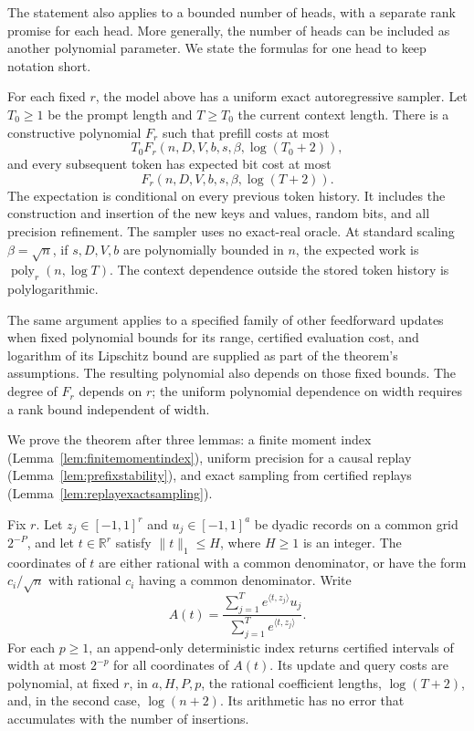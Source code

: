 The statement also applies to a bounded number of heads, with a
separate rank promise for each head.  More generally, the number of
heads can be included as another polynomial parameter.  We state
the formulas for one head to keep notation short.

\begin{theorem}
\label{thm:momentdecoder}
For each fixed $r$, the model above has a uniform exact autoregressive
sampler.  Let $T_0\ge1$ be the prompt length and $T\ge T_0$ the
current context length.  There is a constructive polynomial $F_r$
such that prefill costs at most
\[
 T_0 F_r(n,D,V,b,s,\beta,\log(T_0+2)),
\]
and every subsequent token has expected bit cost at most
\[
 F_r(n,D,V,b,s,\beta,\log(T+2)).
\]
The expectation is conditional on every previous token history.
It includes the construction and insertion of the new keys and
values, random bits, and all precision refinement.  The sampler
uses no exact-real oracle.  At standard scaling $\beta=\sqrt n$,
if $s,D,V,b$ are polynomially bounded in $n$, the expected work is
$\operatorname{poly}_r(n,\log T)$.  The context dependence outside
the stored token history is polylogarithmic.

The same argument applies to a specified family of other
feedforward updates when fixed polynomial bounds for its range,
certified evaluation cost, and logarithm of its Lipschitz bound
are supplied as part of the theorem's assumptions.  The resulting
polynomial also depends on those fixed bounds.  The degree of
$F_r$ depends on $r$; the uniform polynomial dependence on width
requires a rank bound independent of width.
\end{theorem}

We prove the theorem after three lemmas: a finite moment index
(Lemma~\ref{lem:finitemomentindex}), uniform precision for a causal
replay (Lemma~\ref{lem:prefixstability}), and exact sampling from
certified replays (Lemma~\ref{lem:replayexactsampling}).

\begin{lemma}
\label{lem:finitemomentindex}
Fix $r$.  Let $z_j\in[-1,1]^r$ and $u_j\in[-1,1]^a$ be dyadic
records on a common grid $2^{-P}$, and let $t\in\mathbb R^r$
satisfy $\|t\|_1\le H$, where $H\ge1$ is an integer.  The
coordinates of $t$ are either rational with a common denominator,
or have the form $c_i/\sqrt n$ with rational $c_i$ having a common
denominator.  Write
\[
 A(t)=\frac{\sum_{j=1}^T e^{\langle t,z_j\rangle}u_j}
              {\sum_{j=1}^T e^{\langle t,z_j\rangle}}.
\]
For each $p\ge1$, an append-only deterministic index returns
certified intervals of width at most $2^{-p}$ for all coordinates
of $A(t)$.  Its update and query costs are polynomial, at fixed
$r$, in $a,H,P,p$, the rational coefficient lengths, $\log(T+2)$,
and, in the second case, $\log(n+2)$.
Its arithmetic has no error that accumulates with the number of
insertions.
\end{lemma}

